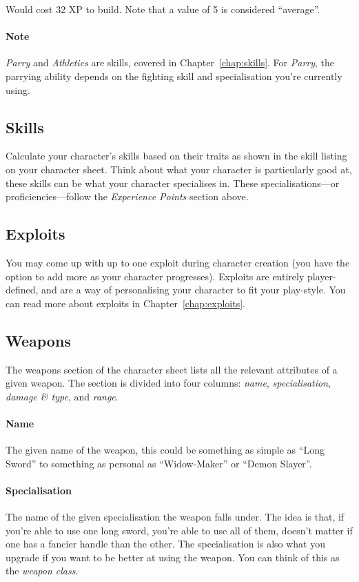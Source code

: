 Would cost 32 XP to build.
Note that a value of 5 is considered ``average''.

\paragraph{Note} \textit{Parry} and \textit{Athletics} are skills, covered in Chapter~\ref{chap:skills}.
For \textit{Parry}, the parrying ability depends on the fighting skill and specialisation you're currently using.

\subsection{Skills}
Calculate your character's skills based on their traits as shown in the skill listing on your character sheet.
Think about what your character is particularly good at, these skills can be what your character specialises in.
These specialisations---or proficiencies---follow the \textit{Experience Points} section above.

\subsection{Exploits}
You may come up with up to one exploit during character creation (you have the option to add more as your character progresses).
Exploits are entirely player-defined, and are a way of personalising your character to fit your play-style.
You can read more about exploits in Chapter~\ref{chap:exploits}.

\subsection{Weapons}
The weapons section of the character sheet lists all the relevant attributes of a given weapon.
The section is divided into four columns: \textit{name}, \textit{specialisation}, \textit{damage \& type}, and \textit{range}.

\paragraph{Name} The given name of the weapon, this could be something as simple as ``Long Sword'' to something as personal as ``Widow-Maker'' or ``Demon Slayer''.

\paragraph{Specialisation} The name of the given specialisation the weapon falls under.
The idea is that, if you're able to use one long sword, you're able to use all of them, doesn't matter if one has a fancier handle than the other. 
The specialisation is also what you upgrade if you want to be better at using the weapon.
You can think of this as the \textit{weapon class}.


